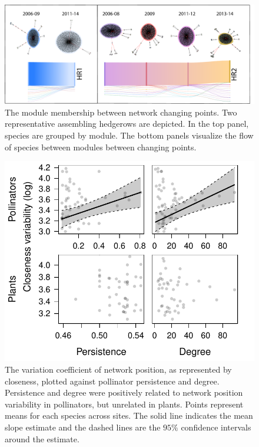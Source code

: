 \documentclass[12pt]{article}
\begin{document}
\begin{figure}
  \centering
  \includegraphics[width=.95\textwidth]{../analysis/changePoint/plotting/communitiesSkanky2.pdf}
  \caption{The module membership between network changing points. Two
    representative assembling hedgerows are depicted. In the top
    panel, species are grouped by module. The bottom panels visualize
    the flow of species between modules between changing points. }
  \label{fig:changePoints2}
\end{figure}
\clearpage

\begin{figure}
  \centering
  \includegraphics[width=.8\textwidth]{../analysis/variability/figures/cv/occ_degree.pdf}
  \caption{The variation coefficient of network position, as
    represented by closeness, plotted against pollinator persistence
    and degree. Persistence and degree were positively related to
    network position variability in pollinators, but unrelated in
    plants. Points represent means for each species across sites. The
    solid line indicates the mean slope estimate and the dashed lines
    are the $95\%$ confidence intervals around the estimate. }
  \label{fig:cv}
\end{figure}
\clearpage
\end{document}
